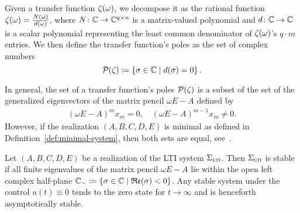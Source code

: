 \begin{definition}
    Given a transfer function $\zeta(\omega)$, we decompose it as the rational function $\zeta(\omega) = \frac{N(\omega)}{d(\omega)}$, where $N \colon \mathbb{C} \to \mathbb{C}^{q \times n}$ is a matrix-valued polynomial and $d \colon \mathbb{C} \to \mathbb{C}$ is a scalar polynomial representing the least common denominator of $\zeta(\omega)$'s $q \cdot m$ entries.
    We then define the transfer function's poles as the set of complex numbers
    \begin{equation*}
        \mathcal{P}(\zeta) \coloneqq \left\{\sigma \in \mathbb{C}\mid d(\sigma) = 0\right\}.
    \end{equation*}
\end{definition}

\begin{remark}
    In general, the set of a transfer function's poles $\mathcal{P}(\zeta)$ is a subset of the set of the generalized eigenvectors of the matrix pencil $\omega E - A$ defined by
    \begin{align*}
        {(\omega E - A)}^m x_m = 0,\quad {(\omega E - A)}^{m - 1} x_m \neq 0.
    \end{align*}
    However, if the realization $(A, B, C, D, E)$ is minimal as defined in Definition~\ref{def:minimal-system}, then both sets are equal, see~\cite[Section~2]{Benner2017}.
\end{remark}

\begin{definition}\label{def:lti-stability}
    Let $(A, B, C, D, E)$ be a realization of the \ac{LTI} system $\Sigma_{\textnormal{\scshape lti}}$.
    Then $\Sigma_{\textnormal{\scshape lti}}$ is stable if all finite eigenvalues of the matrix pencil $\omega E - A$ lie within the open left complex half-plane $\mathbb{C}_{-} \coloneqq \left\{\sigma \in \mathbb{C}\mid\mathfrak{Re}(\sigma) < 0\right\}$.
    Any stable system under the control $u(t) \equiv 0$ tends to the zero state for $t \to \infty$ and is henceforth asymptotically stable.
\end{definition}
